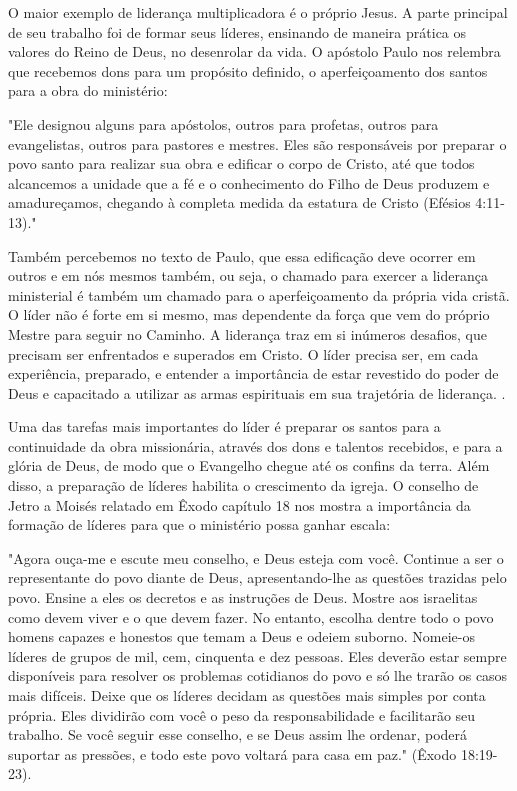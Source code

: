 \documentclass[12pt,openright,oneside,a4paper,
english,french,spanish,brazil]{abntex2}
\begin{document}
O maior exemplo de liderança multiplicadora é o próprio Jesus. A parte principal de seu trabalho foi de formar seus líderes, ensinando de maneira prática os valores do Reino de Deus, no desenrolar da vida. O apóstolo Paulo nos relembra que recebemos dons para um propósito definido, o aperfeiçoamento dos santos para a obra do ministério: 

\begin{citacao}"Ele designou alguns para apóstolos, outros para profetas, outros para evangelistas, outros para pastores e mestres. Eles são responsáveis por preparar o povo santo para realizar sua obra e edificar o corpo de Cristo, até que todos alcancemos a unidade que a fé e o conhecimento do Filho de Deus produzem e amadureçamos, chegando à completa medida da estatura de Cristo (Efésios 4:11-13)."\end{citacao}

Também percebemos no texto de Paulo, que essa edificação deve ocorrer em outros e em nós mesmos também, ou seja, o chamado para exercer a liderança ministerial é também um chamado para o aperfeiçoamento da própria vida cristã. O líder não é forte em si mesmo, mas dependente da força que vem do próprio Mestre para seguir no Caminho\cite[p. 130,131]{brandao}. A liderança traz em si inúmeros desafios, que precisam ser enfrentados e superados em Cristo. O líder precisa ser, em cada experiência, preparado, e entender a importância de estar revestido do poder de Deus e capacitado a utilizar as armas espirituais em sua trajetória de liderança. \cite[p. 132]{brandao}.

Uma das tarefas mais importantes do líder é preparar os santos para a continuidade da obra missionária, através dos dons e talentos recebidos, e para a glória de Deus, de modo que o Evangelho chegue até os confins da terra. Além disso, a preparação de líderes habilita o crescimento da igreja. O conselho de Jetro a Moisés relatado em Êxodo capítulo 18 nos mostra a importância da formação de líderes para que o ministério possa ganhar escala: 

\begin{citacao}"Agora ouça-me e escute meu conselho, e Deus esteja com você. Continue a ser o representante do povo diante de Deus, apresentando-lhe as questões trazidas pelo povo. Ensine a eles os decretos e as instruções de Deus. Mostre aos israelitas como devem viver e o que devem fazer. No entanto, escolha dentre todo o povo homens capazes e honestos que temam a Deus e odeiem suborno. Nomeie-os líderes de grupos de mil, cem, cinquenta e dez pessoas. Eles deverão estar sempre disponíveis para resolver os problemas cotidianos do povo e só lhe trarão os casos mais difíceis. Deixe que os líderes decidam as questões mais simples por conta própria. Eles dividirão com você o peso da responsabilidade e facilitarão seu trabalho. Se você seguir esse conselho, e se Deus assim lhe ordenar, poderá suportar as pressões, e todo este povo voltará para casa em paz." (Êxodo 18:19-23).\end{citacao}
\end{document}
